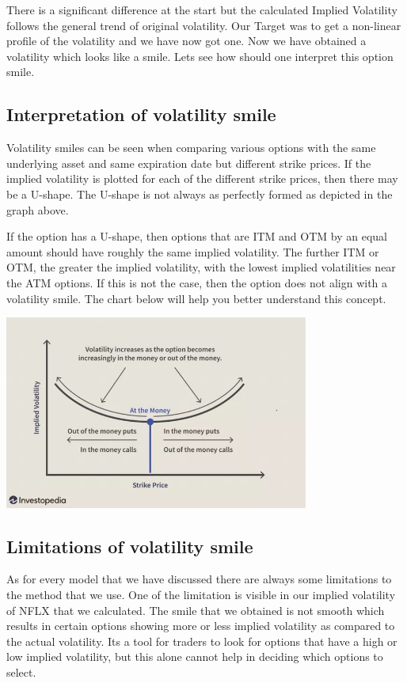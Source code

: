 \documentclass[12pt]{article}
\begin{document}
There is a significant difference at the start but the calculated Implied Volatility follows the general trend of original volatility. Our Target was to get a non-linear profile of the volatility and we have now got one. Now we have obtained a volatility which looks like a smile. Lets see how should one interpret this option smile. 

 \subsection{Interpretation of volatility smile}
Volatility smiles can be seen when comparing various options with the same underlying asset and same expiration date but different strike prices. If the implied volatility is plotted for each of the different strike prices, then there may be a U-shape. The U-shape is not always as perfectly formed as depicted in the graph above.
 
If the option has a U-shape, then options that are ITM and OTM by an equal amount should have roughly the same implied volatility. The further ITM or OTM, the greater the implied volatility, with the lowest implied volatilities near the ATM options. If this is not the case, then the option does not align with a volatility smile. The chart below will help you better understand this concept. \cite{bwordl4}
  

  
  
 	\includegraphics[width=10cm]{vol}
 	
 	  \subsection{Limitations of volatility smile}
 	  
 	  As for every model that we have discussed there are always some limitations to the method that we use. One of the limitation is visible in our implied volatility of NFLX that we calculated. The smile that we obtained is not smooth which results in certain options showing more or less implied volatility as compared to the actual volatility. Its a tool for traders to look for options that have a high or low implied volatility, but this alone cannot help in deciding which options to select. \cite{bwordl4}
  
\end{document}
